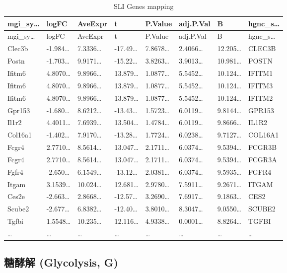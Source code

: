 \documentclass[
]{article}
\begin{document}
\begin{longtable}[]{@{}llllllll@{}}
\caption{\label{tab:SLI-Genes-mapping}SLI Genes mapping}\tabularnewline
\toprule
mgi\_sy\ldots{} & logFC & AveExpr & t & P.Value & adj.P.Val & B & hgnc\_s\ldots{}\tabularnewline
\midrule
\endfirsthead
\toprule
mgi\_sy\ldots{} & logFC & AveExpr & t & P.Value & adj.P.Val & B & hgnc\_s\ldots{}\tabularnewline
\midrule
\endhead
Clec3b & -1.984\ldots{} & 7.3336\ldots{} & -17.49\ldots{} & 7.8678\ldots{} & 2.4066\ldots{} & 12.205\ldots{} & CLEC3B\tabularnewline
Postn & -1.703\ldots{} & 9.9171\ldots{} & -15.22\ldots{} & 3.8263\ldots{} & 3.9013\ldots{} & 10.981\ldots{} & POSTN\tabularnewline
Ifitm6 & 4.8070\ldots{} & 9.8966\ldots{} & 13.879\ldots{} & 1.0877\ldots{} & 5.5452\ldots{} & 10.124\ldots{} & IFITM1\tabularnewline
Ifitm6 & 4.8070\ldots{} & 9.8966\ldots{} & 13.879\ldots{} & 1.0877\ldots{} & 5.5452\ldots{} & 10.124\ldots{} & IFITM3\tabularnewline
Ifitm6 & 4.8070\ldots{} & 9.8966\ldots{} & 13.879\ldots{} & 1.0877\ldots{} & 5.5452\ldots{} & 10.124\ldots{} & IFITM2\tabularnewline
Gpr153 & -1.680\ldots{} & 8.6212\ldots{} & -13.43\ldots{} & 1.5723\ldots{} & 6.0119\ldots{} & 9.8144\ldots{} & GPR153\tabularnewline
Il1r2 & 4.4011\ldots{} & 7.6939\ldots{} & 13.504\ldots{} & 1.4784\ldots{} & 6.0119\ldots{} & 9.8666\ldots{} & IL1R2\tabularnewline
Col16a1 & -1.402\ldots{} & 7.9170\ldots{} & -13.28\ldots{} & 1.7724\ldots{} & 6.0238\ldots{} & 9.7127\ldots{} & COL16A1\tabularnewline
Fcgr4 & 2.7710\ldots{} & 8.5614\ldots{} & 13.047\ldots{} & 2.1711\ldots{} & 6.0374\ldots{} & 9.5394\ldots{} & FCGR3B\tabularnewline
Fcgr4 & 2.7710\ldots{} & 8.5614\ldots{} & 13.047\ldots{} & 2.1711\ldots{} & 6.0374\ldots{} & 9.5394\ldots{} & FCGR3A\tabularnewline
Fgfr4 & -2.650\ldots{} & 6.1549\ldots{} & -13.12\ldots{} & 2.0381\ldots{} & 6.0374\ldots{} & 9.5935\ldots{} & FGFR4\tabularnewline
Itgam & 3.1539\ldots{} & 10.024\ldots{} & 12.681\ldots{} & 2.9780\ldots{} & 7.5911\ldots{} & 9.2671\ldots{} & ITGAM\tabularnewline
Ces2e & -2.663\ldots{} & 2.8668\ldots{} & -12.57\ldots{} & 3.2690\ldots{} & 7.6917\ldots{} & 9.1863\ldots{} & CES2\tabularnewline
Scube2 & -2.677\ldots{} & 6.8382\ldots{} & -12.40\ldots{} & 3.8010\ldots{} & 8.3047\ldots{} & 9.0550\ldots{} & SCUBE2\tabularnewline
Tgfbi & 1.5548\ldots{} & 10.235\ldots{} & 12.116\ldots{} & 4.9338\ldots{} & 0.0001\ldots{} & 8.8264\ldots{} & TGFBI\tabularnewline
\ldots{} & \ldots{} & \ldots{} & \ldots{} & \ldots{} & \ldots{} & \ldots{} & \ldots{}\tabularnewline
\bottomrule
\end{longtable}

\hypertarget{gly}{%
\subsection{糖酵解 (Glycolysis, G)}\label{gly}}
\end{document}
